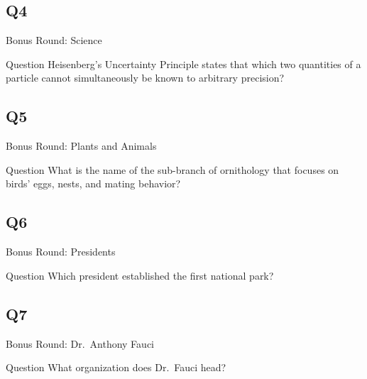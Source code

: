 \documentclass[11pt]{beamer}
\begin{document}
\subsection*{Q4}
\begin{frame}[t]{Bonus Round: Science}
\vspace{0.5em}
\begin{block}{Question}
Heisenberg's Uncertainty Principle states that which two quantities of a particle cannot simultaneously be known to arbitrary precision?
\end{block}
\end{frame}
    

\subsection*{Q5}
\begin{frame}[t]{Bonus Round: Plants and Animals}
\vspace{0.5em}
\begin{block}{Question}
What is the name of the sub-branch of ornithology that focuses on birds' eggs, nests, and mating behavior?
\end{block}
\end{frame}
    

\subsection*{Q6}
\begin{frame}[t]{Bonus Round: Presidents}
\vspace{0.5em}
\begin{block}{Question}
Which president established the first national park?
\end{block}
\end{frame}
    

\subsection*{Q7}
\begin{frame}[t]{Bonus Round: Dr.\ Anthony Fauci}
\vspace{0.5em}
\begin{block}{Question}
What organization does Dr.\ Fauci head?
\end{block}
\end{frame}
    
\end{document}
